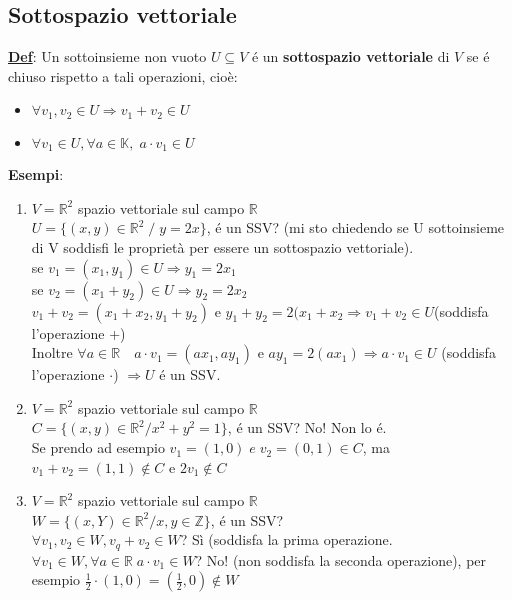 \documentclass[12pt]{article}
\begin{document}
\subsection{Sottospazio vettoriale}
\textbf{\underline{Def}}: Un sottoinsieme non vuoto $U \subseteq{V}$ é un \textbf{sottospazio vettoriale} di $V$ se é chiuso rispetto a tali operazioni, cioè:
\begin{itemize}
    \item[] $\forall v_1, v_2 \in U \Longrightarrow v_1+v_2 \in U$
    \item[] $\forall v_1 \in U, \forall a \in \mathbb{K}, \; a\cdot v_1 \in U$
\end{itemize}
\textbf{Esempi}:
\begin{enumerate}
    \item $V = \mathbb{R}^2$ spazio vettoriale sul campo $\mathbb{R}$\\
    $U = \{(x,y) \in \mathbb{R}^2 \;/\; y = 2x\}$, é un SSV? (mi sto chiedendo se U sottoinsieme di V soddisfi le proprietà per essere un sottospazio vettoriale).\\
    se $v_1 = (x_1,y_1) \in U \Longrightarrow y_1 = 2x_1$\\
    se $v_2 = (x_1 + y_2) \in U \Longrightarrow y_2 = 2x_2$\\
    $v_1 +v_2 = (x_1 + x_2, y_1+y_2)$ e $y_1 + y_2 = 2(x_1 + x_2 \Longrightarrow v_1+v_2 \in U$(soddisfa l'operazione +) \\
    Inoltre $\forall a \in \mathbb{R} \quad a\cdot v_1 = (ax_1, ay_1)$ e $ay_1 = 2(ax_1) \Longrightarrow a\cdot v_1 \in U$ (soddisfa l'operazione $\cdot$) $\Longrightarrow U$ é un SSV.
    \item $V = \mathbb{R}^2$ spazio vettoriale sul campo $\mathbb{R}$\\
    $C = \{(x,y) \in \mathbb{R}^2 / x^2 + y^2 = 1\}$, é un SSV? No! Non lo é.\\
    Se prendo ad esempio $v_1 = (1,0) \;e \;v_2 = (0,1) \in C$, ma $v_1 + v_2 = (1,1) \notin C$ e $2v_1 \notin C$\\
    \item $V = \mathbb{R}^2$ spazio vettoriale sul campo $\mathbb{R}$\\
    $W = \{(x,Y) \in \mathbb{R}^2 / x,y \in \mathbb{Z}\}$, é un SSV?\\
    $\forall v_1, v_2 \in W, v_q+v_2 \in W$? Sì (soddisfa la prima operazione.\\
    $\forall v_1 \in W, \forall a \in \mathbb{R} \;a\cdot v_1 \in W$? No! (non soddisfa la seconda operazione), per esempio $\frac{1}{2}\cdot (1,0) = (\frac{1}{2}, 0) \notin W$\\

\end{enumerate}
\end{document}

